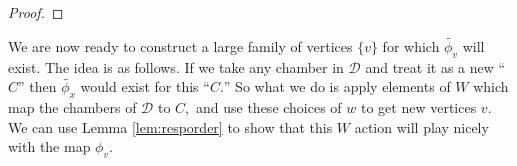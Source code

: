 \documentclass[class=book, crop=false,12 pt]{standalone}
\begin{document}
\begin{proof}
%
%
%
%
%
\end{proof}


We are now ready to construct a large family of vertices $\{v\}$ for which $\tilde{\phi_v}$ will exist. The idea is as follows. If we take any chamber in $\mathcal{D}$ and treat it as a new ``$C$'' then $\tilde{\phi_x}$ would exist for this ``$C.$'' So what we do is apply elements of $W$ which map the chambers of $\mathcal{D}$ to $C,$ and use these choices of $w$ to get new vertices $v.$ We can use Lemma \ref{lem:resporder} to show that this $W$ action will play nicely with the map $\phi_v.$
\end{document}
